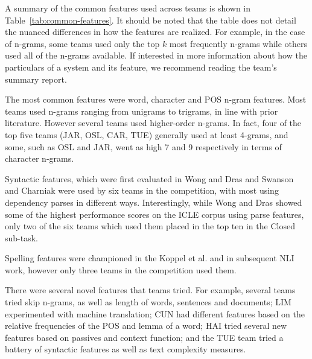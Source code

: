 \documentclass[11pt,letterpaper]{article}
\begin{document}
A summary of the common features used across teams is shown in Table~\ref{tab:common-features}.  It should be noted that the table does not detail the nuanced differences in
how the features are realized.  For example, in the case of n-grams, some teams
used only the top $k$ most frequently n-grams while others used all of the n-grams
available.  If interested in more information about how the particulars of a system
and its feature, we recommend reading the team's summary report.

The most common features were word, character and POS n-gram
features.  Most teams used n-grams ranging from unigrams to trigrams, in line with
prior literature.  However several teams used higher-order n-grams.  In fact, four
of the top five teams (JAR, OSL, CAR, TUE) generally used at least 4-grams, and some,
such as OSL and JAR, went as high 7 and 9 respectively in terms of character n-grams.

Syntactic features, which were first evaluated in Wong and Dras  and Swanson and Charniak  were used
by six teams in the competition, with most using dependency parses in different ways.
Interestingly, while Wong and Dras  showed some of the
highest performance scores on the ICLE corpus using parse features, only two of the six
teams which used them placed in the top ten in the Closed sub-task.

Spelling features were championed in the Koppel et al. 
and in subsequent NLI work, however only three teams in the competition used them.

There were several novel features that teams tried.  For example,
several teams tried skip n-grams, as well as length of words, sentences
and documents; LIM
experimented with machine translation; CUN had different features
based on the relative frequencies of the POS and lemma of a word;
HAI tried several new features based on passives and context function;
and the TUE team tried a battery of syntactic features as well as
text complexity measures.
\end{document}
